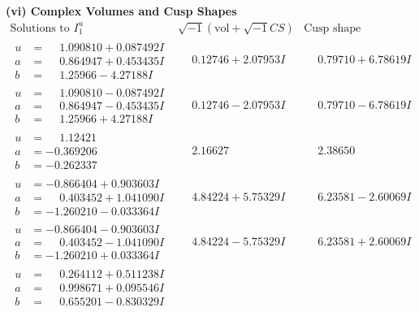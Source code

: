 \documentclass[1p]{elsarticle_modified}
\theoremstyle{definition}
\newcommand{\I}{\sqrt{-1}}
\begin{document}
\newpage\flushleft \textbf{(vi) Complex Volumes and Cusp Shapes}
$$\begin{array}{c|c|c}  
\text{Solutions to }I^u_{1}& \I (\text{vol} + \sqrt{-1}CS) & \text{Cusp shape}\\
 \hline 
\begin{aligned}
u &= \phantom{-}1.090810 + 0.087492 I \\
a &= \phantom{-}0.864947 + 0.453435 I \\
b &= \phantom{-}1.25966 - 4.27188 I\end{aligned}
 & \phantom{-}0.12746 + 2.07953 I & \phantom{-}0.79710 + 6.78619 I \\ \hline\begin{aligned}
u &= \phantom{-}1.090810 - 0.087492 I \\
a &= \phantom{-}0.864947 - 0.453435 I \\
b &= \phantom{-}1.25966 + 4.27188 I\end{aligned}
 & \phantom{-}0.12746 - 2.07953 I & \phantom{-}0.79710 - 6.78619 I \\ \hline\begin{aligned}
u &= \phantom{-}1.12421\phantom{ +0.000000I} \\
a &= -0.369206\phantom{ +0.000000I} \\
b &= -0.262337\phantom{ +0.000000I}\end{aligned}
 & \phantom{-}2.16627\phantom{ +0.000000I} & \phantom{-}2.38650\phantom{ +0.000000I} \\ \hline\begin{aligned}
u &= -0.866404 + 0.903603 I \\
a &= \phantom{-}0.403452 + 1.041090 I \\
b &= -1.260210 - 0.033364 I\end{aligned}
 & \phantom{-}4.84224 + 5.75329 I & \phantom{-}6.23581 - 2.60069 I \\ \hline\begin{aligned}
u &= -0.866404 - 0.903603 I \\
a &= \phantom{-}0.403452 - 1.041090 I \\
b &= -1.260210 + 0.033364 I\end{aligned}
 & \phantom{-}4.84224 - 5.75329 I & \phantom{-}6.23581 + 2.60069 I \\ \hline\begin{aligned}
u &= \phantom{-}0.264112 + 0.511238 I \\
a &= \phantom{-}0.998671 + 0.095546 I \\
b &= \phantom{-}0.655201 - 0.830329 I\end{aligned}

\end{array}$$
\end{document}
